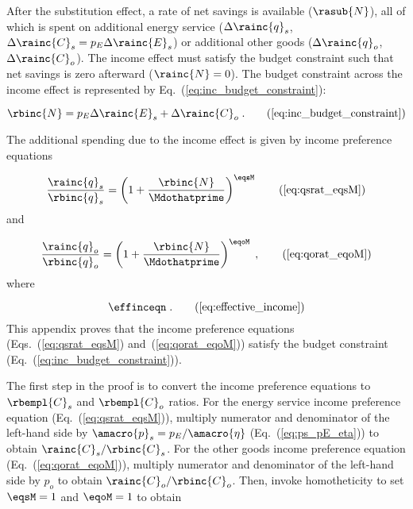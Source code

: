 

After the substitution effect, 
a rate of net savings is available ($\rasub{N}$), 
all of which is spent on
additional energy service ($\Delta \rainc{q}_s$, $\Delta \rainc{C}_s = p_E \Delta \rainc{E}_s$) or 
additional other goods ($\Delta \rainc{q}_o$, $\Delta \rainc{C}_o$).
The income effect must satisfy the budget constraint
such that net savings is zero afterward ($\rainc{N} = 0$).
The budget constraint across the income effect 
is represented by Eq.~(\ref{eq:inc_budget_constraint}): 

\begin{equation}
  \rbinc{N} = p_E \Delta \rainc{E}_s + \Delta \rainc{C}_o \; . \tag{\ref{eq:inc_budget_constraint}}
\end{equation}

The additional spending due to the income effect is given by income preference equations

\begin{equation}
  \frac{\rainc{q}_s}{\rbinc{q}_s} = \left( 1 + \frac{\rbinc{N}}{\Mdothatprime}  \right) ^{\eqsM} 
                                                                \tag{\ref{eq:qsrat_eqsM}}
\end{equation}
%
and

\begin{equation}
  \frac{\rainc{q}_o}{\rbinc{q}_o} = \left( 1 + \frac{\rbinc{N}}{\Mdothatprime}  \right) ^{\eqoM} \; ,
                                                                \tag{\ref{eq:qorat_eqoM}}
\end{equation}
%
where

\begin{equation}
  \effinceqn \; . \tag{\ref{eq:effective_income}}
\end{equation}
%
This appendix proves that the income preference equations 
(Eqs.~(\ref{eq:qsrat_eqsM}) and~(\ref{eq:qorat_eqoM}))
satisfy the budget constraint (Eq.~(\ref{eq:inc_budget_constraint})).

The first step in the proof is to convert 
the income preference equations
to $\rbempl{C}_s$ and $\rbempl{C}_o$ ratios.
For the energy service income preference equation (Eq.~(\ref{eq:qsrat_eqsM})), 
multiply numerator and denominator of the left-hand side by $\amacro{p}_s = p_E / \amacro{\eta}$
(Eq.~(\ref{eq:ps_pE_eta}))
to obtain $\rainc{C}_s / \rbinc{C}_s$.
For the other goods income preference equation (Eq.~(\ref{eq:qorat_eqoM})), 
multiply numerator and denominator of the left-hand side by $p_o$
to obtain $\rainc{C}_o / \rbinc{C}_o$.
Then, invoke homotheticity to set $\eqsM = 1$ and $\eqoM = 1$ to obtain

